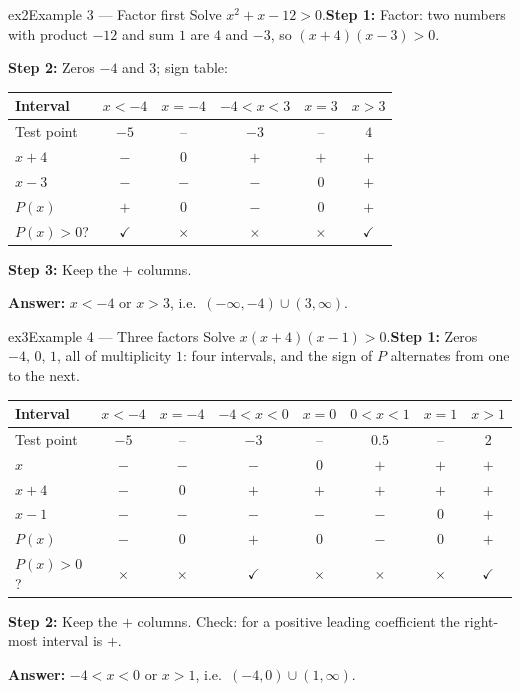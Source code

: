 \documentclass[11pt]{article}
\begin{document}
\begin{example}{ex2}{Example 3 --- Factor first}
Solve $x^2+x-12>0$.\soln \textbf{Step 1:} Factor: two numbers with product $-12$ and sum $1$ are $4$ and $-3$, so $(x+4)(x-3)>0$.

\textbf{Step 2:} Zeros $-4$ and $3$; sign table:\begin{center}\small\setlength{\tabcolsep}{4pt}\renewcommand{\arraystretch}{1.2}
\begin{tabular}{l|ccccc}
\hline
Interval & $x<-4$ & $x=-4$ & $-4<x<3$ & $x=3$ & $x>3$ \\ \hline
Test point & $-5$ & -- & $-3$ & -- & $4$ \\ \hline
$x+4$ & $-$ & $0$ & $+$ & $+$ & $+$ \\
$x-3$ & $-$ & $-$ & $-$ & $0$ & $+$ \\
\hline
$P(x)$ & $+$ & $0$ & $-$ & $0$ & $+$ \\ \hline
$P(x)>0$? & $\checkmark$ & $\times$ & $\times$ & $\times$ & $\checkmark$ \\ \hline
\end{tabular}\end{center}\textbf{Step 3:} Keep the $+$ columns.

\textbf{Answer:} $x<-4\text{ or }x>3$, i.e.\ $(-\infty,-4)\cup(3,\infty)$.
\end{example}

\begin{example}{ex3}{Example 4 --- Three factors}
Solve $x(x+4)(x-1)>0$.\soln \textbf{Step 1:} Zeros $-4,\,0,\,1$, all of multiplicity $1$: four intervals, and the sign of $P$ alternates from one to the next.\begin{center}\small\setlength{\tabcolsep}{4pt}\renewcommand{\arraystretch}{1.2}
\begin{tabular}{l|ccccccc}
\hline
Interval & $x<-4$ & $x=-4$ & $-4<x<0$ & $x=0$ & $0<x<1$ & $x=1$ & $x>1$ \\ \hline
Test point & $-5$ & -- & $-3$ & -- & $0.5$ & -- & $2$ \\ \hline
$x$ & $-$ & $-$ & $-$ & $0$ & $+$ & $+$ & $+$ \\
$x+4$ & $-$ & $0$ & $+$ & $+$ & $+$ & $+$ & $+$ \\
$x-1$ & $-$ & $-$ & $-$ & $-$ & $-$ & $0$ & $+$ \\
\hline
$P(x)$ & $-$ & $0$ & $+$ & $0$ & $-$ & $0$ & $+$ \\ \hline
$P(x)>0$? & $\times$ & $\times$ & $\checkmark$ & $\times$ & $\times$ & $\times$ & $\checkmark$ \\ \hline
\end{tabular}\end{center}\textbf{Step 2:} Keep the $+$ columns. Check: for a positive leading coefficient the right-most interval is $+$.

\textbf{Answer:} $-4<x<0\text{ or }x>1$, i.e.\ $(-4,0)\cup(1,\infty)$.
\end{example}
\end{document}
